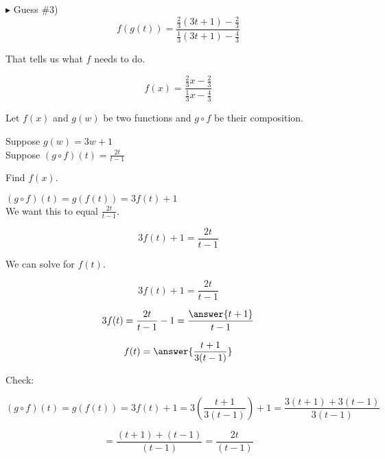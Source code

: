 \documentclass{ximera}
\begin{document}
\begin{example}
\begin{explanation}
$\blacktriangleright$  Guess \#3) \\


\[   f(g(t)) =      \frac{\frac{2}{3}(3t + 1) - \frac{2}{3}}{\frac{1}{3}(3t + 1) - \frac{4}{3}}       \]

That tells us what $f$ needs to do.




\[   f(x) =      \frac{\frac{2}{3}x - \frac{2}{3}}{\frac{1}{3}x - \frac{4}{3}}       \]



\end{explanation}

\end{example}























\begin{example}


Let $f(x)$ and $g(w)$ be two functions and $g \circ f$ be their composition.


Suppose $g(w) = 3w + 1$ \\

Suppose $(g \circ f)(t) = \frac{2t}{t-1}$


Find $f(x)$.



\begin{explanation}




$(g \circ f)(t) =  g(f(t)) = 3 f(t) + 1$ \\


We want this to equal $\frac{2t}{t-1}$.




\[
3 f(t) + 1 = \frac{2t}{t-1}
\]


We can solve for $f(t)$.



\[
3 f(t) + 1 = \frac{2t}{t-1}
\]

\[
3 f(t) = \frac{2t}{t-1} - 1 = \frac{\answer{t+1}}{t-1}
\]

\[
f(t)  = \answer{\frac{t+1}{3(t-1)}}
\]



Check:

\[
(g \circ f)(t) =  g(f(t)) = 3 f(t) + 1 = 3 \left( \frac{t+1}{3(t-1)} \right) + 1 = \frac{3(t+1) + 3(t-1)}{3(t-1)} 
\]


\[
 = \frac{(t+1) + (t-1)}{(t-1)}  = \frac{2t}{(t-1)}
\]



\end{explanation}

\end{example}
\end{document}
